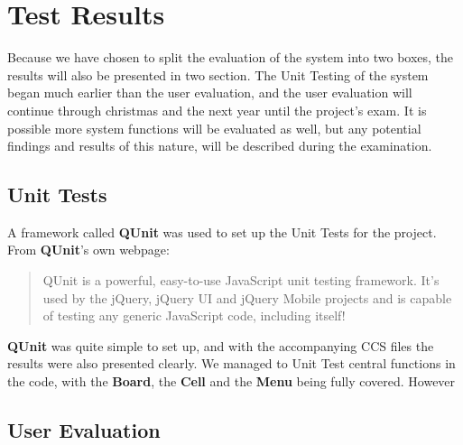\section{Test Results}
\label{sec:testresults}

Because we have chosen to split the evaluation of the system into two boxes, the results will also be presented in two section. The Unit Testing of the system began much earlier than the user evaluation, and the user evaluation will continue through christmas and the next year until the project's exam. It is possible more system functions will be evaluated as well, but any potential findings and results of this nature, will be described during the examination.

\subsection{Unit Tests}

A framework called \textbf{QUnit} was used to set up the Unit Tests for the project. From \textbf{QUnit}'s own webpage:

\begin{quotation}
QUnit is a powerful, easy-to-use JavaScript unit testing framework. It's used by the jQuery, jQuery UI and jQuery Mobile projects and is capable of testing any generic JavaScript code, including itself!\cite{qunit}
\end{quotation}

\textbf{QUnit} was quite simple to set up, and with the accompanying CCS files the results were also presented clearly. We managed to Unit Test central functions in the code, with the \textbf{Board}, the \textbf{Cell} and the \textbf{Menu} being fully covered. However

\subsection{User Evaluation}

